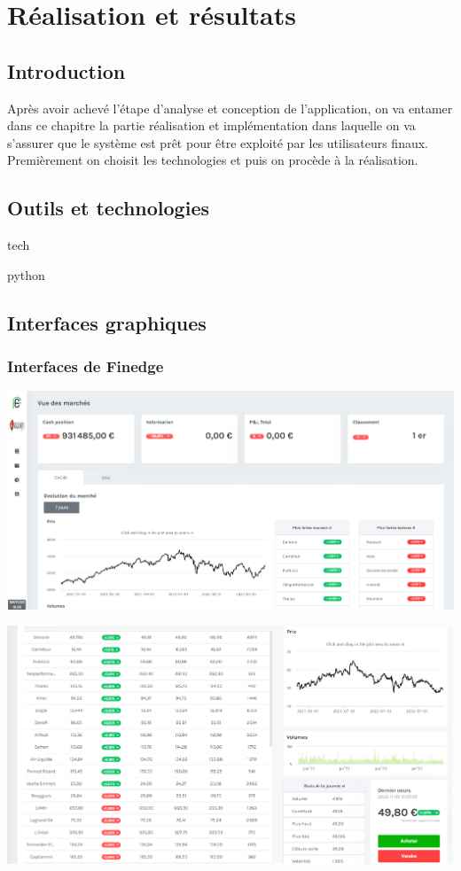 \chapter{Réalisation et résultats}

\section{Introduction}

Après avoir achevé l’étape d’analyse et conception de l’application, on va entamer dans ce chapitre la partie réalisation et implémentation dans laquelle on va s’assurer que le système est prêt pour être exploité par les utilisateurs finaux. Premièrement on choisit les technologies et puis on procède à la réalisation.


\section{Outils et technologies}

tech

python



\section{Interfaces graphiques}

\subsection{Interfaces de Finedge}

\begin{center}
\includegraphics[scale=0.25]{images/fin} 
\end{center}


\begin{center}
\includegraphics[scale=0.25]{images/fin2} 
\end{center}


